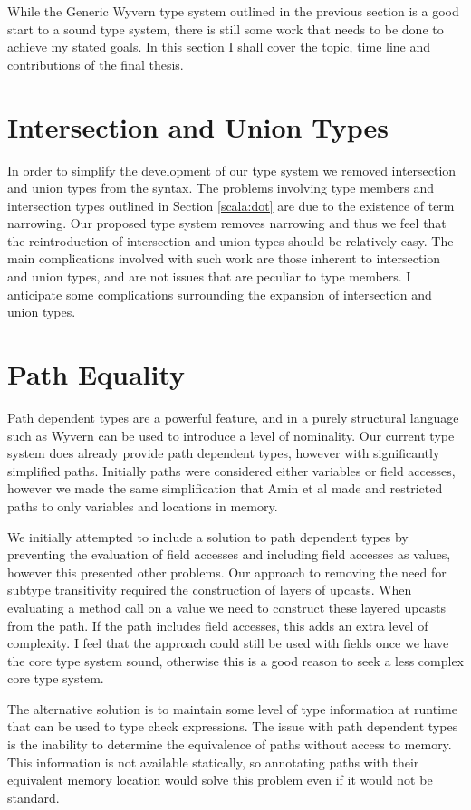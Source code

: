 \documentclass[11pt
              , a4paper
              , twoside
              , openright
              ]{report}
\numberwithin{case}{theorem}
\numberwithin{subcase}{case}
\begin{document}
While the Generic Wyvern type system outlined in the previous section is a good start to a sound type system, there is still some work that needs to be done to achieve my stated goals. In this section I shall cover the topic, time line and contributions of the final thesis.

\section{Intersection and Union Types}
In order to simplify the development of our type system we removed intersection and union types from the syntax. The problems involving type members and intersection types outlined in Section \ref{scala:dot} are due to the existence of term narrowing. Our proposed type system removes narrowing and thus we feel that the reintroduction of intersection and union types should be relatively easy. The main complications involved with such work are those inherent to intersection and union types, and are not issues that are peculiar to type members. I anticipate some complications surrounding the expansion of intersection and union types. 

\section{Path Equality}
Path dependent types are a powerful feature, and in a purely structural language such as Wyvern can be used to introduce a level of nominality. Our current type system does already provide path dependent types, however with significantly simplified paths. Initially paths were considered either variables or field accesses, however we made the same simplification that Amin et al \cite{Amin:2014:FPT:2660193.2660216} made and restricted paths to only variables and locations in memory.

We initially attempted to include a solution to path dependent types by preventing the evaluation of field accesses and including field accesses as values, however this presented other problems. Our approach to removing the need for subtype transitivity required the construction of layers of upcasts. When evaluating a method call on a value we need to construct these layered upcasts from the path. If the path includes field accesses, this adds an extra level of complexity. I feel that the approach could still be used with fields once we have the core type system sound, otherwise this is a good reason to seek a less complex core type system.

The alternative solution is to maintain some level of type information at runtime that can be used to type check expressions. The issue with path dependent types is the inability to determine the equivalence of paths without access to memory. This information is not available statically, so annotating paths with their equivalent memory location  would solve this problem even if it would not be standard.
\end{document}
